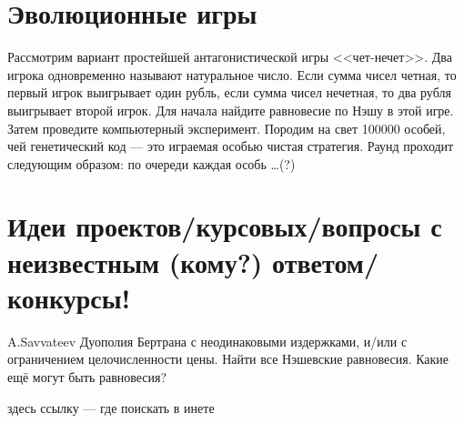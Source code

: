 \section{Эволюционные игры}

\begin{problem}[Эволюция]

Рассмотрим вариант простейшей антагонистической игры <<чет-нечет>>. Два игрока одновременно называют натуральное число. Если сумма чисел четная, то первый игрок выигрывает один рубль, если сумма чисел нечетная, то два рубля выигрывает второй игрок. Для начала найдите равновесие по Нэшу в этой игре. Затем проведите компьютерный эксперимент. Породим на свет 100000 особей, чей генетический код --- это играемая особью чистая стратегия. Раунд проходит следующим образом: по очереди каждая особь \ldots (?)



\begin{sol}

\end{sol}
\end{problem}














\section{Идеи проектов/курсовых/вопросы с неизвестным (кому?) ответом/конкурсы!}


\begin{problem}
 A.Savvateev
Дуополия Бертрана с неодинаковыми издержками,
и/или с ограничением целочисленности цены. Найти
все Нэшевские равновесия. Какие ещё могут быть
равновесия?



\begin{sol}
здесь ссылку --- где поискать в инете
\end{sol}
\end{problem}




